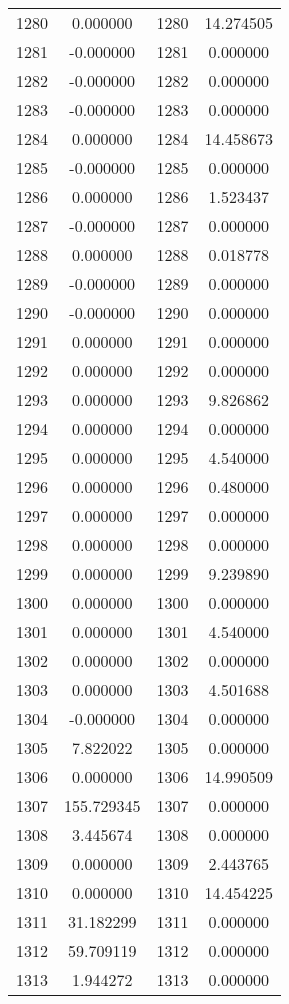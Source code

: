 \documentclass[12pt]{article}
\begin{document}
\begin{longtable}{@{}cccc@{}}
1280 & 0.000000 & 1280 & 14.274505 \\
1281 & -0.000000 & 1281 & 0.000000 \\
1282 & -0.000000 & 1282 & 0.000000 \\
1283 & -0.000000 & 1283 & 0.000000 \\
1284 & 0.000000 & 1284 & 14.458673 \\
1285 & -0.000000 & 1285 & 0.000000 \\
1286 & 0.000000 & 1286 & 1.523437 \\
1287 & -0.000000 & 1287 & 0.000000 \\
1288 & 0.000000 & 1288 & 0.018778 \\
1289 & -0.000000 & 1289 & 0.000000 \\
1290 & -0.000000 & 1290 & 0.000000 \\
1291 & 0.000000 & 1291 & 0.000000 \\
1292 & 0.000000 & 1292 & 0.000000 \\
1293 & 0.000000 & 1293 & 9.826862 \\
1294 & 0.000000 & 1294 & 0.000000 \\
1295 & 0.000000 & 1295 & 4.540000 \\
1296 & 0.000000 & 1296 & 0.480000 \\
1297 & 0.000000 & 1297 & 0.000000 \\
1298 & 0.000000 & 1298 & 0.000000 \\
1299 & 0.000000 & 1299 & 9.239890 \\
1300 & 0.000000 & 1300 & 0.000000 \\
1301 & 0.000000 & 1301 & 4.540000 \\
1302 & 0.000000 & 1302 & 0.000000 \\
1303 & 0.000000 & 1303 & 4.501688 \\
1304 & -0.000000 & 1304 & 0.000000 \\
1305 & 7.822022 & 1305 & 0.000000 \\
1306 & 0.000000 & 1306 & 14.990509 \\
1307 & 155.729345 & 1307 & 0.000000 \\
1308 & 3.445674 & 1308 & 0.000000 \\
1309 & 0.000000 & 1309 & 2.443765 \\
1310 & 0.000000 & 1310 & 14.454225 \\
1311 & 31.182299 & 1311 & 0.000000 \\
1312 & 59.709119 & 1312 & 0.000000 \\
1313 & 1.944272 & 1313 & 0.000000 \\

\end{longtable}
\end{document}
